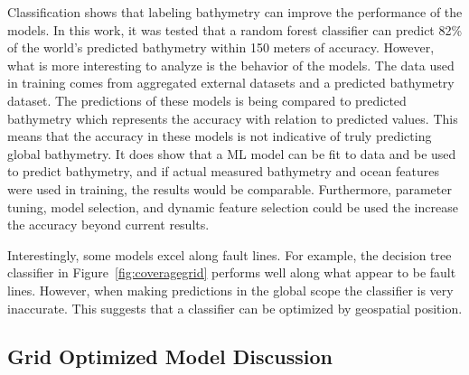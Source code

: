\par
Classification shows that labeling bathymetry can improve the performance of the models.
In this work, it was tested that a random forest classifier can predict 82\% of the world's predicted bathymetry within 150 meters of accuracy. 
However, what is more interesting to analyze is the behavior of the models.
The data used in training comes from aggregated external datasets and a predicted bathymetry dataset.
The predictions of these models is being compared to predicted bathymetry which represents the accuracy with relation to predicted values.
This means that the accuracy in these models is not indicative of truly predicting global bathymetry.
It does show that a \ac{ML} model can be fit to data and be used to predict bathymetry, and if actual measured bathymetry and ocean features were used in training, the results would be comparable.
Furthermore, parameter tuning, model selection, and dynamic feature selection could be used the increase the accuracy beyond current results.

\par
Interestingly, some models excel along fault lines.
For example, the decision tree classifier in Figure~\ref{fig:coveragegrid} performs well along what appear to be fault lines.
However, when making predictions in the global scope the classifier is very inaccurate.
This suggests that a classifier can be optimized by geospatial position.



\subsection{Grid Optimized Model Discussion}


